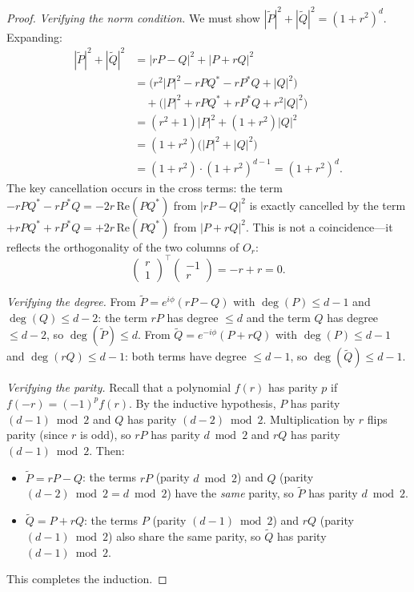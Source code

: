 \begin{proof}
	\textit{Verifying the norm condition.}
	We must show
	$|\widetilde{P}|^2 + |\widetilde{Q}|^2 = (1+r^2)^d$.
	Expanding:
	\begin{align}
		|\widetilde{P}|^2 + |\widetilde{Q}|^2
		 & = |rP - Q|^2 + |P + rQ|^2 \nonumber                            \\
		 & = \bigl(r^2|P|^2 - rPQ^* - rP^*Q + |Q|^2\bigr) \nonumber       \\
		 & \quad + \bigl(|P|^2 + rPQ^* + rP^*Q + r^2|Q|^2\bigr) \nonumber \\
		 & = (r^2+1)|P|^2 + (1+r^2)|Q|^2 \nonumber                        \\
		 & = (1+r^2)\bigl(|P|^2+|Q|^2\bigr) \nonumber                     \\
		 & = (1+r^2)\cdot(1+r^2)^{d-1} = (1+r^2)^d.
		\tag{A14}
	\end{align}
	The key cancellation occurs in the cross terms: the
	term $-rPQ^* - rP^*Q = -2r\,\mathrm{Re}(PQ^*)$
	from $|rP - Q|^2$ is exactly cancelled by the
	term $+rPQ^* + rP^*Q = +2r\,\mathrm{Re}(PQ^*)$
	from $|P + rQ|^2$.  This is not a coincidence---it
	reflects the orthogonality of the two columns of $O_r$:
	\begin{equation}
		\begin{pmatrix}r \\ 1\end{pmatrix}^{\!\top}
		\begin{pmatrix}-1 \\ r\end{pmatrix} = -r + r = 0.
		\tag{A15}
	\end{equation}

	\textit{Verifying the degree.}
	From $\widetilde{P} = e^{i\phi}(rP - Q)$ with
	$\deg(P) \leq d-1$ and $\deg(Q) \leq d-2$: the term
	$rP$ has degree $\leq d$ and the term $Q$ has degree
	$\leq d-2$, so $\deg(\widetilde{P}) \leq d$.
	From $\widetilde{Q} = e^{-i\phi}(P + rQ)$ with
	$\deg(P) \leq d-1$ and $\deg(rQ) \leq d-1$: both
	terms have degree $\leq d-1$, so
	$\deg(\widetilde{Q}) \leq d-1$.

	\textit{Verifying the parity.}
	Recall that a polynomial $f(r)$ has parity $p$ if
	$f(-r) = (-1)^p f(r)$.  By the inductive hypothesis,
	$P$ has parity $(d-1)\bmod 2$ and $Q$ has parity
	$(d-2)\bmod 2$.  Multiplication by $r$ flips parity
	(since $r$ is odd), so $rP$ has parity $d\bmod 2$ and
	$rQ$ has parity $(d-1)\bmod 2$.  Then:
	\begin{itemize}
		\item $\widetilde{P} = rP - Q$: the terms $rP$
		      (parity $d\bmod 2$) and $Q$ (parity
		      $(d-2)\bmod 2 = d\bmod 2$) have the
		      \emph{same} parity, so
		      $\widetilde{P}$ has parity $d\bmod 2$.
		\item $\widetilde{Q} = P + rQ$: the terms $P$
		      (parity $(d-1)\bmod 2$) and $rQ$ (parity
		      $(d-1)\bmod 2$) also share the same parity,
		      so $\widetilde{Q}$ has parity
		      $(d-1)\bmod 2$.
	\end{itemize}
	This completes the induction.
\end{proof}

